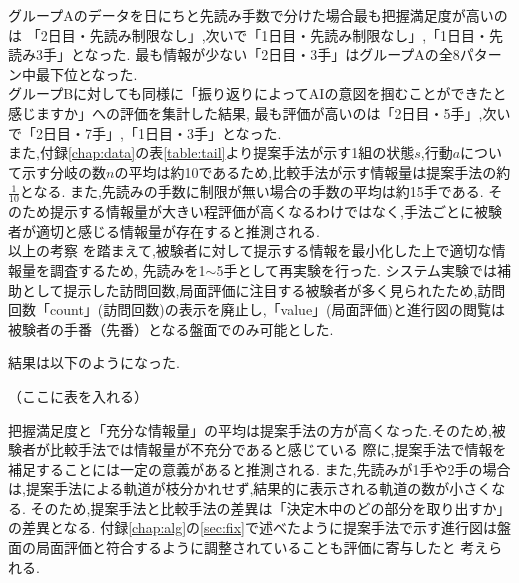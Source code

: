 グループAのデータを日にちと先読み手数で分けた場合最も把握満足度が高いのは
「2日目・先読み制限なし」,次いで「1日目・先読み制限なし」,「1日目・先読み3手」となった.
最も情報が少ない「2日目・3手」はグループAの全8パターン中最下位となった.\\


グループBに対しても同様に「振り返りによってAIの意図を掴むことができたと感じますか」への評価を集計した結果,
最も評価が高いのは「2日目・5手」,次いで「2日目・7手」,「1日目・3手」となった.\\



また,付録\ref{chap:data}の表\ref{table:tail}より提案手法が示す1組の状態$s$,行動$a$について示す分岐の数$n$の平均は約10であるため,比較手法が示す情報量は提案手法の約$\frac{1}{10}$となる.
また,先読みの手数に制限が無い場合の手数の平均は約15手である.
そのため提示する情報量が大きい程評価が高くなるわけではなく,手法ごとに被験者が適切と感じる情報量が存在すると推測される.\\

以上の考察
を踏まえて,被験者に対して提示する情報を最小化した上で適切な情報量を調査するため,
先読みを1$\sim$5手として再実験を行った.
システム実験では補助として提示した訪問回数,局面評価に注目する被験者が多く見られたため,訪問回数「count」(訪問回数)の表示を廃止し,「value」(局面評価)と進行図の閲覧は被験者の手番（先番）となる盤面でのみ可能とした.

結果は以下のようになった.

（ここに表を入れる）


把握満足度と「充分な情報量」の平均は提案手法の方が高くなった.そのため,被験者が比較手法では情報量が不充分であると感じている
際に,提案手法で情報を補足することには一定の意義があると推測される.
また,先読みが1手や2手の場合は,提案手法による軌道が枝分かれせず,結果的に表示される軌道の数が小さくなる.
そのため,提案手法と比較手法の差異は「決定木中のどの部分を取り出すか」の差異となる.
付録\ref{chap:alg}の\ref{sec:fix}で述べたように提案手法で示す進行図は盤面の局面評価と符合するように調整されていることも評価に寄与したと
考えられる.